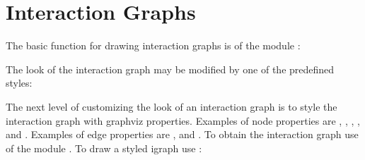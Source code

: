 \documentclass[letterpaper,10pt,english]{sphinxmanual}
\begin{document}
\section{Interaction Graphs}
\label{\detokenize{ManualQuick:interaction-graphs}}
The basic function for drawing interaction graphs is {\hyperref[\detokenize{InteractionGraphs:igs-create-image}]{}} of the module {\hyperref[\detokenize{InteractionGraphs:interactiongraphs}]{}}:

\begin{sphinxVerbatim}[commandchars=\\\{\}]
  
 
\end{sphinxVerbatim}

The look of the interaction graph may be modified by one of the predefined styles:

\begin{sphinxVerbatim}[commandchars=\\\{\}]
  \PYG{p}{[} \PYG{p}{]}
\end{sphinxVerbatim}

The next level of customizing the look of an interaction graph is to style the interaction graph with graphviz properties.
Examples of node properties are , , , ,  and .
Examples of edge properties are ,  and .
To obtain the interaction graph use {\hyperref[\detokenize{InteractionGraphs:primes2igraph}]{}} of the module {\hyperref[\detokenize{InteractionGraphs:interactiongraphs}]{}}.
To draw a styled igraph use {\hyperref[\detokenize{InteractionGraphs:igraph2image}]{}}:
\end{document}
